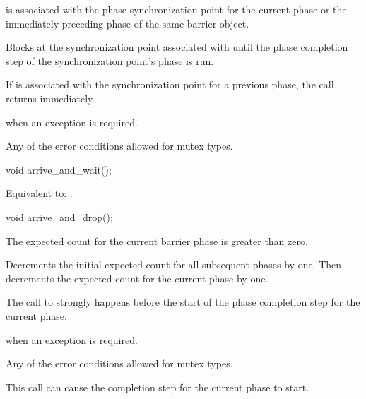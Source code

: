 \begin{itemdescr}
\pnum
\expects
{} is associated with
the phase synchronization point for the current phase or
the immediately preceding phase of the same barrier object.

\pnum
{}%
\effects
Blocks at the synchronization point associated with 
until the phase completion step of the synchronization point's phase is run.
\begin{note}
If  is associated with the synchronization point
for a previous phase, the call returns immediately.
\end{note}

\pnum
\throws
{} when an exception is required.

\pnum
\errors
Any of the error conditions
allowed for mutex types.
\end{itemdescr}

%
\begin{itemdecl}
void arrive_and_wait();
\end{itemdecl}

\begin{itemdescr}
\pnum
\effects
Equivalent to: .
\end{itemdescr}

%
\begin{itemdecl}
void arrive_and_drop();
\end{itemdecl}

\begin{itemdescr}
\pnum
\expects
The expected count for the current barrier phase is greater than zero.

\pnum
\effects
Decrements the initial expected count for all subsequent phases by one.
Then decrements the expected count for the current phase by one.

\pnum
\sync
The call to  strongly happens before
the start of the phase completion step for the current phase.

\pnum
\throws
{} when an exception is required.

\pnum
\errors
Any of the error conditions
allowed for mutex types.

\pnum
\begin{note}
This call can cause the completion step for the current phase to start.
\end{note}
\end{itemdescr}


